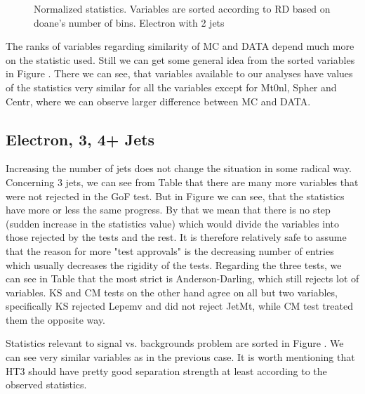 \begin{figure}[h]
\quad
    \caption{Normalized statistics. Variables are sorted according to RD based on doane's number of bins. Electron with 2 jets}
    \label{fig:e2j-statsSort}
\end{figure}

The ranks of variables regarding similarity of MC and DATA depend much more on the statistic used. Still we can get some general idea from the  sorted variables in Figure  . There we can see, that variables available to our analyses have values of the statistics very similar for all the variables except for \textsf{Mt0nl, Spher} and \textsf{Centr}, where we can observe larger difference between MC and DATA. 

\subsection{Electron, 3, 4+ Jets}

Increasing the number of jets does not change the situation in some radical way. Concerning 3 jets, we can see from Table  that there are many more variables that were not rejected in the GoF test. But in Figure  we can see, that the statistics have more or less the same progress. By that  we mean that there is no step (sudden increase in the statistics value) which would divide the variables into those rejected by the tests and the rest. It is therefore relatively safe to assume that the reason for more "test approvals" is the decreasing number of entries which usually decreases the rigidity of the tests. Regarding the three tests, we can see in Table  that the most strict is Anderson-Darling, which still rejects lot of variables. KS and CM tests on the other hand agree on all but two variables, specifically KS rejected \textsf{Lepemv} and did not reject \textsf{JetMt}, while CM  test treated them the opposite way. 

Statistics relevant to signal vs. backgrounds problem are sorted in Figure . We can see very similar variables as in the previous case. It is worth mentioning that \textsf{HT3} should have  pretty good separation strength at least according to the observed statistics. 

